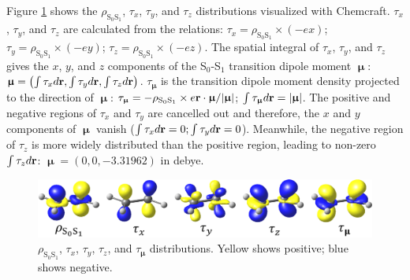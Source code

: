 ﻿\documentclass[11pt,a4paper,openany]{article}
\begin{document}
\indent
Figure \ref{fig:tdmd} shows the $\rho_{\mathrm{S}_0\mathrm{S}_1}$, $\tau_x$, $\tau_y$, and $\tau_z$ distributions visualized with Chemcraft. 
$\tau_x$, $\tau_y$, and $\tau_z$ are calculated from the relations:
$\tau_x = \rho_{\mathrm{S}_0\mathrm{S}_1}\times\left(-ex\right)$; 
$\tau_y = \rho_{\mathrm{S}_0\mathrm{S}_1}\times\left(-ey\right)$;
$\tau_z = \rho_{\mathrm{S}_0\mathrm{S}_1}\times\left(-ez\right)$. 
The spatial integral of $\tau_x$, $\tau_y$, and $\tau_z$ gives the $x$, $y$, and $z$ components of the S$_0$-S$_1$ 
transition dipole moment $\bm{\upmu}$: $\bm{\upmu} = \left(\int \tau_x d{\bf{r}}, \int \tau_y d{\bf{r}}, \int \tau_z d{\bf{r}}\right)$.
$\tau_{\bm{\upmu}}$ is the transition dipole moment density projected to the direction of $\bm{\upmu}$:
$\tau_{\bm{\upmu}} = -\rho_{\mathrm{S}_0\mathrm{S}_1}\times{e}\bf{r}\cdot\bm{\upmu}/|\bm{\upmu}|$;
$\int \tau_{\bm{\upmu}} d{\bf{r}} = |\bm{\upmu}|$.
The positive and negative regions of $\tau_x$ and $\tau_y$ are cancelled out and therefore, the $x$ and $y$ components of $\bm{\upmu}$ vanish ($\int \tau_x d{\bf{r}} = 0; \int \tau_y d{\bf{r}} = 0$). Meanwhile, the negative region of $\tau_z$ is more widely distributed than the positive region, leading to non-zero $\int \tau_z d\bf{r}$:  $\bm{\upmu} = \left(0, 0, -3.31962\right)$ in debye.\\

\begin{figure}[h]
\centering
\includegraphics[width=15cm]{tdmd.eps}
\caption{
$\rho_{\mathrm{S}_0\mathrm{S}_1}$, $\tau_x$, $\tau_y$, $\tau_z$, and $\tau_{\bm{\upmu}}$ distributions.
Yellow shows positive; blue shows negative.
}
\label{fig:tdmd}
\end{figure}

\clearpage
\end{document}
